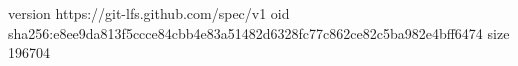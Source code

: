 version https://git-lfs.github.com/spec/v1
oid sha256:e8ee9da813f5ccce84cbb4e83a51482d6328fc77c862ce82c5ba982e4bff6474
size 196704
